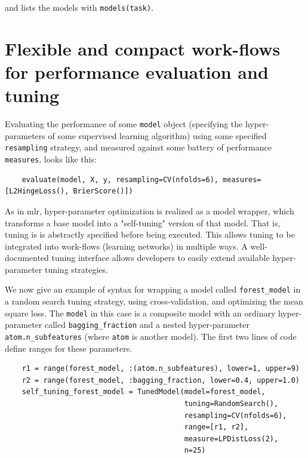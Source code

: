 \documentclass{article}
\begin{document}
and lists the models with \texttt{models(task)}. 

\section{Flexible and compact work-flows for performance evaluation and tuning}

Evaluating the performance of some \texttt{model} object (specifying the hyper-parameters of some supervised learning algorithm) using some specified \texttt{resampling} strategy, and measured against some battery of performance \texttt{measures}, looks like this:

\begin{verbatim}
    evaluate(model, X, y, resampling=CV(nfolds=6), measures=[L2HingeLoss(), BrierScore()])
\end{verbatim}


As in mlr, hyper-parameter optimization is realized as a model wrapper, which transforms a base model into a "self-tuning" version of that model. That is, tuning is is abstractly specified before being executed. This allows tuning to be integrated into work-flows (learning networks) in multiple ways. A well-documented tuning interface \cite{MLJTuning} allows developers to easily extend available hyper-parameter tuning strategies.

We now give an example of syntax for wrapping a model called \texttt{forest\_model} in a random search tuning strategy, using cross-validation, and optimizing the mean square loss. The \texttt{model} in this case is a composite model with an ordinary hyper-parameter called \texttt{bagging\_fraction} and a nested hyper-parameter \texttt{atom.n\_subfeatures} (where \texttt{atom} is another model). The first two lines of code define ranges for these parameters.

\begin{verbatim}
    r1 = range(forest_model, :(atom.n_subfeatures), lower=1, upper=9)
    r2 = range(forest_model, :bagging_fraction, lower=0.4, upper=1.0)
    self_tuning_forest_model = TunedModel(model=forest_model,
                                          tuning=RandomSearch(),
                                          resampling=CV(nfolds=6),
                                          range=[r1, r2],
                                          measure=LPDistLoss(2),
                                          n=25)
\end{verbatim}
\end{document}
